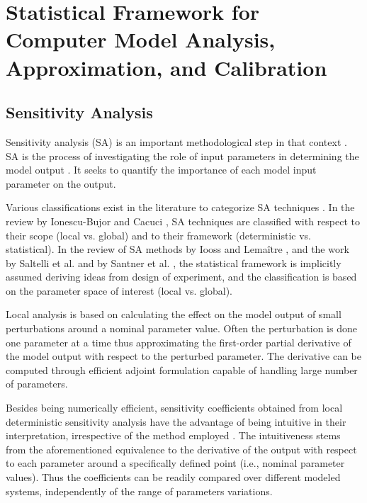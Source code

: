 \section{Statistical Framework for Computer Model Analysis, Approximation, and Calibration}\label{sec:intro_statistical_framework}

\subsection{Sensitivity Analysis}

Sensitivity analysis (SA) is an important methodological step in that context \cite{Trucano2006}.
SA is the process of investigating the role of input parameters in determining the model output \cite{Iooss2015}. 
It seeks to quantify the importance of each model input parameter on the output.

Various classifications exist in the literature to categorize SA techniques \cite{Frey2002, Ionescu-Bujor2004, Cacuci2004, Saltelli2008, Iooss2015}.
In the review by Ionescu-Bujor and Cacuci \cite{Ionescu-Bujor2004, Cacuci2004}, 
SA techniques are classified with respect to their scope (local vs. global) and to their framework (deterministic vs. statistical).
In the review of SA methods by Iooss and Lemaître \cite{Iooss2015}, 
and the work by Saltelli et al. \cite{Saltelli2008} and by Santner et al. \cite{Santner2003}, 
the statistical framework is implicitly assumed deriving ideas from design of experiment, 
and the classification is based on the parameter space of interest (local vs. global).

Local analysis is based on calculating the effect on the model output of small perturbations around a nominal parameter value. 
Often the perturbation is done one parameter at a time thus approximating the first-order partial derivative of the model output with respect to the perturbed parameter. 
The derivative can be computed through efficient adjoint formulation \cite{Cacuci2003,Cacuci2010} capable of handling large number of parameters.


Besides being numerically efficient, 
sensitivity coefficients obtained from local deterministic sensitivity analysis have the advantage of being intuitive in their interpretation, 
irrespective of the method employed \cite{Razavi2015}. 
The intuitiveness stems from the aforementioned equivalence to the derivative of the output with respect to each parameter \cite{Ionescu-Bujor2004} around a specifically defined point (i.e., nominal parameter values). 
Thus the coefficients can be readily compared over different modeled systems, 
independently of the range of parameters variations.


